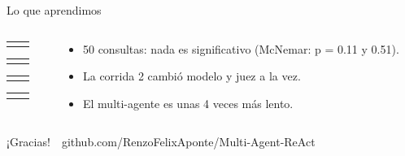 \documentclass[aspectratio=1610, 11pt]{beamer}
\makeatletter
\newcommand{\leccion}[2]{%
  \begin{tabular}{@{}p{28mm}@{\hspace{2mm}}p{\dimexpr\linewidth-30mm\relax}@{}}
    \leavevmode{\color{cAcc}\fontsize{14}{16}\selectfont #1} &
    \hyphenpenalty=10000\raggedright\leavevmode{\small #2\par}
  \end{tabular}\par\vspace{2.2mm}}
\makeatother
\begin{document}
\begin{frame}{Lo que aprendimos}
  \begin{columns}[T,onlytextwidth]
    \begin{column}{0.6\textwidth}
      \leccion{0 de 15}{Verificar ejecutando, no opinando.}
      \leccion{0.85 vs 0.54}{El juez cambia la conclusión: usar uno independiente.}
      \leccion{6 de 50}{Abstenerse baja el promedio, pero evita errores.}
      \leccion{9 vs 14}{Más andamiaje no siempre ayuda: Qwen ya resolvía GSM8K solo.}
    \end{column}
    \begin{column}{0.36\textwidth}
      {\scriptsize\color{cSrc}
      \begin{itemize}\setlength{\itemsep}{1.2mm}
        \item 50 consultas: nada es significativo (McNemar: p = 0.11 y 0.51).
        \item La corrida 2 cambió modelo y juez a la vez.
        \item El multi-agente es unas 4 veces más lento.
      \end{itemize}\par}
    \end{column}
  \end{columns}
  \vfill
  {\fontsize{16}{19}\selectfont\color{cAcc}¡Gracias!}\ \ \hfill{\scriptsize\ttfamily\color{cSrc}github.com/RenzoFelixAponte/Multi-Agent-ReAct}\par
  \vspace{1mm}
\end{frame}
\end{document}

